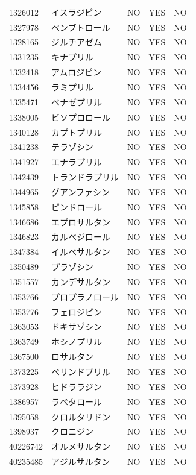 \documentclass[
  11pt]{book}
\theoremstyle{definition}
\theoremstyle{definition}
\theoremstyle{definition}
\theoremstyle{definition}
\theoremstyle{remark}
\begin{document}
\begin{longtable}[]{@{}lllll@{}}
1326012 & イスラジピン & NO & YES & NO \\
1327978 & ペンブトロール & NO & YES & NO \\
1328165 & ジルチアゼム & NO & YES & NO \\
1331235 & キナプリル & NO & YES & NO \\
1332418 & アムロジピン & NO & YES & NO \\
1334456 & ラミプリル & NO & YES & NO \\
1335471 & ベナゼプリル & NO & YES & NO \\
1338005 & ビソプロロール & NO & YES & NO \\
1340128 & カプトプリル & NO & YES & NO \\
1341238 & テラゾシン & NO & YES & NO \\
1341927 & エナラプリル & NO & YES & NO \\
1342439 & トランドラプリル & NO & YES & NO \\
1344965 & グアンファシン & NO & YES & NO \\
1345858 & ピンドロール & NO & YES & NO \\
1346686 & エプロサルタン & NO & YES & NO \\
1346823 & カルベジロール & NO & YES & NO \\
1347384 & イルベサルタン & NO & YES & NO \\
1350489 & プラゾシン & NO & YES & NO \\
1351557 & カンデサルタン & NO & YES & NO \\
1353766 & プロプラノロール & NO & YES & NO \\
1353776 & フェロジピン & NO & YES & NO \\
1363053 & ドキサゾシン & NO & YES & NO \\
1363749 & ホシノプリル & NO & YES & NO \\
1367500 & ロサルタン & NO & YES & NO \\
1373225 & ペリンドプリル & NO & YES & NO \\
1373928 & ヒドララジン & NO & YES & NO \\
1386957 & ラベタロール & NO & YES & NO \\
1395058 & クロルタリドン & NO & YES & NO \\
1398937 & クロニジン & NO & YES & NO \\
40226742 & オルメサルタン & NO & YES & NO \\
40235485 & アジルサルタン & NO & YES & NO \\
\end{longtable}
\end{document}
